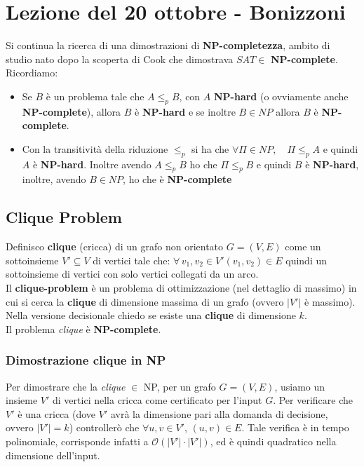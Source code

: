 \section{Lezione del 20 ottobre - Bonizzoni}

Si continua la ricerca di una dimostrazioni di \textbf{NP-completezza}, ambito di studio nato dopo la scoperta di Cook che dimostrava $SAT\in$ \textbf{NP-complete}.\\ 
Ricordiamo:
\begin{itemize}
    \item Se $B$ è un problema tale che $A\leq_p B$, con $A$ \textbf{NP-hard} (o ovviamente anche \textbf{NP-complete}), allora $B$ è \textbf{NP-hard} e se inoltre $B\in NP$ allora $B$ è \textbf{NP-complete}.
    \item Con la transitività della riduzione $\leq_p$ si ha che $\forall\Pi\in NP, \quad \Pi\leq_p A$ e quindi $A$ è \textbf{NP-hard}. Inoltre avendo $A\leq_p B$ ho che  $\Pi\leq_p B$ e quindi $B$ è \textbf{NP-hard}, inoltre, avendo $B\in NP$, ho che è \textbf{NP-complete} 
\end{itemize}   

\subsection{Clique Problem}

Definisco \textbf{clique} (cricca) di un grafo non orientato $G=(V,E)$ come un sottoinsieme $V'\subseteq V$ di vertici tale che: $\forall \,v_1,v_2\in V' (v_1,v_2)\in E$ quindi un sottoinsieme di vertici con solo vertici collegati da un arco.\\
Il \textbf{clique-problem} è un problema di ottimizzazione (nel dettaglio di massimo) in cui si cerca la \textbf{clique} di dimensione massima di un grafo (ovvero $|V'|$ è massimo). Nella versione decisionale chiedo se esiste una \textbf{clique} di dimensione $k$.\\ Il problema \textit{clique} è \textbf{NP-complete}.

\subsubsection{Dimostrazione clique in NP}
Per dimostrare che la \textit{clique} $\in $ NP, per un grafo $G=(V,E)$, usiamo un insieme $V'$ di vertici nella cricca come certificato per l'input $G$. Per verificare che $V'$ è una cricca (dove $V'$ avrà la dimensione pari alla domanda di decisione, ovvero $|V'| = k$) controllerò che $\forall u,v \in V'$, $(u,v) \in E$. Tale verifica è in tempo polinomiale, corrisponde infatti a $\mathcal{O}(|V'| \cdot |V'|)$, ed è quindi quadratico nella dimensione dell'input.

